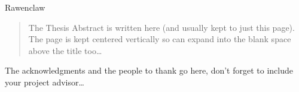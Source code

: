 \documentclass[
12pt, %
oneside, %
english, %
doublespacing, %
nolistspacing, %
headsepline, %
chapterinoneline, %
]{MastersDoctoralThesis} %
\begin{document}
\hfill Rawenclaw


\begin{abstract}
\addchaptertocentry{\abstractname} %
The Thesis Abstract is written here (and usually kept to just this page). The page is kept centered vertically so can expand into the blank space above the title too\ldots
\end{abstract}


\begin{acknowledgements}
\addchaptertocentry{\acknowledgementname} %
The acknowledgments and the people to thank go here, don't forget to include your project advisor\ldots
\end{acknowledgements}


\tableofcontents %

\listoffigures %

\listoftables %

\end{document}
